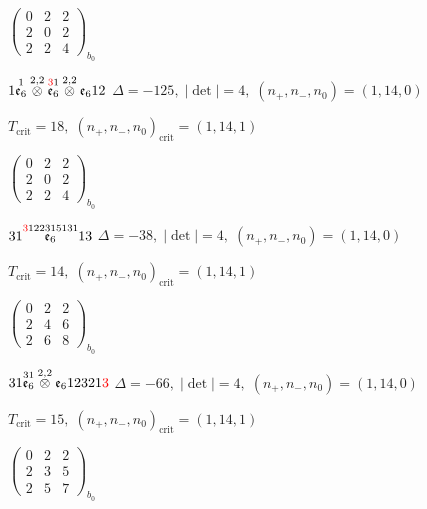 \documentclass[10pt]{article}
\begin{document}
\hspace{2em}$\left(\begin{smallmatrix}0 & 2 & 2 \\ 2 & 0 & 2 \\ 2 & 2 & 4\end{smallmatrix}\right)_{\!b_0}$

\smallskip

$1\overset{1}{\mathfrak{e}_6}\overset{2,2}{\otimes}\overset{\textcolor{red}{3}1}{\mathfrak{e}_6}\overset{2,2}{\otimes}\mathfrak{e}_612$ \quad $\Delta=-125,\; |\det|=4,\; (n_+,n_-,n_0)=(1,14,0)$

\hspace{1em}$T_{\text{crit}}=18,\; (n_+,n_-,n_0)_{\text{crit}}=(1,14,1)$

\hspace{2em}$\left(\begin{smallmatrix}0 & 2 & 2 \\ 2 & 0 & 2 \\ 2 & 2 & 4\end{smallmatrix}\right)_{\!b_0}$

\smallskip

$31\overset{\textcolor{red}{3}122315131}{\mathfrak{e}_6}13$ \quad $\Delta=-38,\; |\det|=4,\; (n_+,n_-,n_0)=(1,14,0)$

\hspace{1em}$T_{\text{crit}}=14,\; (n_+,n_-,n_0)_{\text{crit}}=(1,14,1)$

\hspace{2em}$\left(\begin{smallmatrix}0 & 2 & 2 \\ 2 & 4 & 6 \\ 2 & 6 & 8\end{smallmatrix}\right)_{\!b_0}$

\smallskip

$31\overset{31}{\mathfrak{e}_6}\overset{2,2}{\otimes}\mathfrak{e}_612321\textcolor{red}{3}$ \quad $\Delta=-66,\; |\det|=4,\; (n_+,n_-,n_0)=(1,14,0)$

\hspace{1em}$T_{\text{crit}}=15,\; (n_+,n_-,n_0)_{\text{crit}}=(1,14,1)$

\hspace{2em}$\left(\begin{smallmatrix}0 & 2 & 2 \\ 2 & 3 & 5 \\ 2 & 5 & 7\end{smallmatrix}\right)_{\!b_0}$
\end{document}

